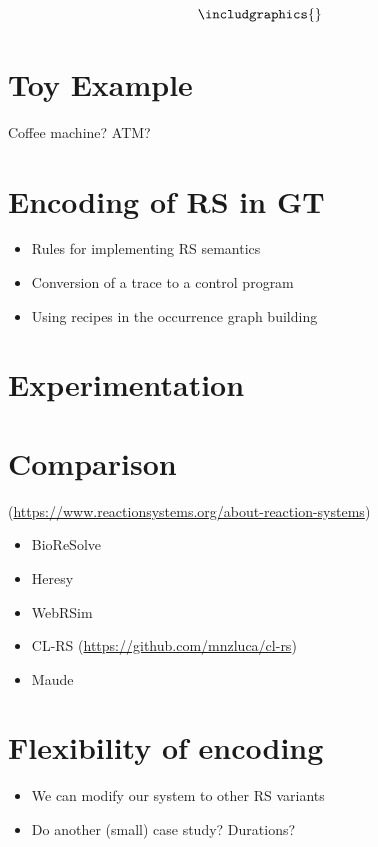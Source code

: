 \documentclass[sn-mathphys-num,a4paper,iicol,lineno,pdflatex]{sn-jnl-hacked}
\theoremstyle{thmstyleone}%
\theoremstyle{thmstyletwo}%
\theoremstyle{thmstylethree}%
\begin{document}
\[\includgraphics{}\]




\section{Toy Example}

Coffee machine? ATM?

\section{Encoding of RS in GT}
\begin{itemize}
\item Rules for implementing RS semantics
\item Conversion of a trace to a control program
\item Using recipes in the occurrence graph building
\end{itemize}

\section{Experimentation}

\section{Comparison}
(\url{https://www.reactionsystems.org/about-reaction-systems})
\begin{itemize}
\item BioReSolve
\item Heresy
\item WebRSim
\item CL-RS (\url{https://github.com/mnzluca/cl-rs})
\item Maude
\end{itemize}

\section{Flexibility of encoding}
\begin{itemize}
\item We can modify our system to other RS variants
\item Do another (small) case study? Durations?
\end{itemize}



\backmatter

\end{document}
